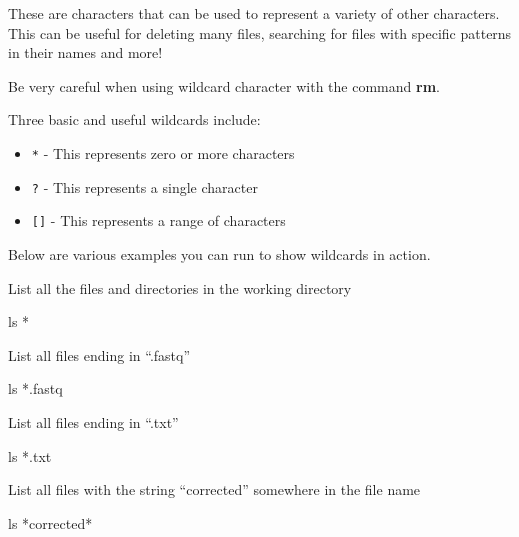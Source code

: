 \documentclass[
  letterpaper,
  DIV=11,
  numbers=noendperiod]{scrreprt}
\newenvironment{Shaded}{\begin{snugshade}}{\end{snugshade}}
\newcommand{\FunctionTok}[1]{\textcolor[rgb]{0.28,0.35,0.67}{#1}}
\newcommand{\NormalTok}[1]{\textcolor[rgb]{0.00,0.23,0.31}{#1}}
\newcommand{\PreprocessorTok}[1]{\textcolor[rgb]{0.68,0.00,0.00}{#1}}
\providecommand{\tightlist}{%
  \setlength{\itemsep}{0pt}\setlength{\parskip}{0pt}}\usepackage{longtable,booktabs,array}
\begin{document}
These are characters that can be used to represent a variety of other
characters. This can be useful for deleting many files, searching for
files with specific patterns in their names and more!

Be very careful when using wildcard character with the command
\textbf{rm}.

Three basic and useful wildcards include:

\begin{itemize}
\tightlist
\item
  \texttt{*} - This represents zero or more characters\\
\item
  \texttt{?} - This represents a single character\\
\item
  \texttt{{[}{]}} - This represents a range of characters
\end{itemize}

Below are various examples you can run to show wildcards in action.

List all the files and directories in the working directory

\begin{Shaded}
\begin{Highlighting}[]
\FunctionTok{ls} \PreprocessorTok{*}
\end{Highlighting}
\end{Shaded}

List all files ending in ``.fastq''

\begin{Shaded}
\begin{Highlighting}[]
\FunctionTok{ls} \PreprocessorTok{*}\NormalTok{.fastq}
\end{Highlighting}
\end{Shaded}

List all files ending in ``.txt''

\begin{Shaded}
\begin{Highlighting}[]
\FunctionTok{ls} \PreprocessorTok{*}\NormalTok{.txt}
\end{Highlighting}
\end{Shaded}

List all files with the string ``corrected'' somewhere in the file name

\begin{Shaded}
\begin{Highlighting}[]
\FunctionTok{ls} \PreprocessorTok{*}\NormalTok{corrected}\PreprocessorTok{*}
\end{Highlighting}
\end{Shaded}
\end{document}

